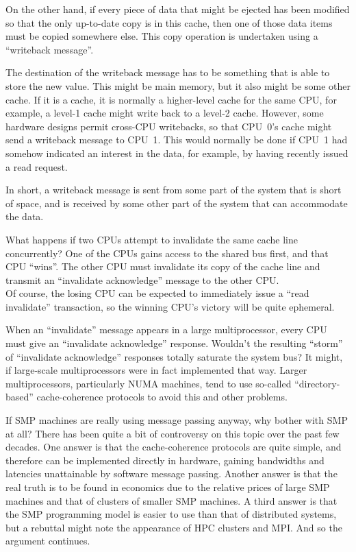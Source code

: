 	On the other hand, if every piece of data that might be ejected
	has been modified so that the only up-to-date copy is in this
	cache, then one of those data items must be copied somewhere
	else.
	This copy operation is undertaken using a ``writeback message''.

	The destination of the writeback message has to be something
	that is able to store the new value.
	This might be main memory, but it also might be some other cache.
	If it is a cache, it is normally a higher-level cache for the
	same CPU, for example, a level-1 cache might write back to a
	level-2 cache.
	However, some hardware designs permit cross-CPU writebacks,
	so that CPU~0's cache might send a writeback message to CPU~1.
	This would normally be done if CPU~1 had somehow indicated
	an interest in the data, for example, by having recently
	issued a read request.

	In short, a writeback message is sent from some part of the
	system that is short of space, and is received by some other
	part of the system that can accommodate the data.

\QuickQ{}
	What happens if two CPUs attempt to invalidate the
	same cache line concurrently?
\QuickA{}
	One of the CPUs gains access
	to the shared bus first,
	and that CPU ``wins''.  The other CPU must invalidate its copy of the
	cache line and transmit an ``invalidate acknowledge'' message
	to the other CPU. \\
	Of course, the losing CPU can be expected to immediately issue a
	``read invalidate'' transaction, so the winning CPU's victory will
	be quite ephemeral.

\QuickQ{}
	When an ``invalidate'' message appears in a large multiprocessor,
	every CPU must give an ``invalidate acknowledge'' response.
	Wouldn't the resulting ``storm'' of ``invalidate acknowledge''
	responses totally saturate the system bus?
\QuickA{}
	It might, if large-scale multiprocessors were in fact implemented
	that way.  Larger multiprocessors, particularly NUMA machines,
	tend to use so-called ``directory-based'' cache-coherence
	protocols to avoid this and other problems.

\QuickQ{}
	If SMP machines are really using message passing
	anyway, why bother with SMP at all?
\QuickA{}
	There has been quite a bit of controversy on this topic over
	the past few decades.  One answer is that the cache-coherence
	protocols are quite simple, and therefore can be implemented
	directly in hardware, gaining bandwidths and latencies
	unattainable by software message passing.  Another answer is that
	the real truth is to be found in economics due to the relative
	prices of large SMP machines and that of clusters of smaller
	SMP machines.  A third answer is that the SMP programming
	model is easier to use than that of distributed systems, but
	a rebuttal might note the appearance of HPC clusters and MPI.
	And so the argument continues.

